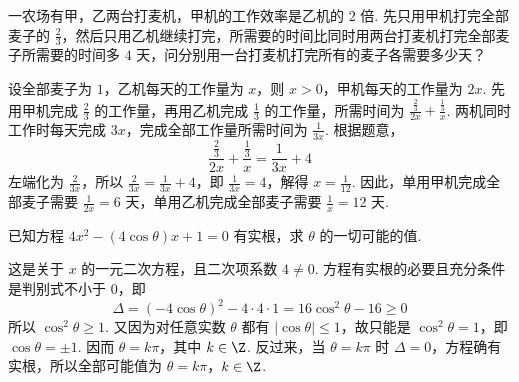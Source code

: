 \begin{problem}
一农场有甲，乙两台打麦机，甲机的工作效率是乙机的 \(2\) 倍. 先只用甲机打完全部麦子的 \(\frac{2}{3}\)，然后只用乙机继续打完，所需要的时间比同时用两台打麦机打完全部麦子所需要的时间多 \(4\) 天，问分别用一台打麦机打完所有的麦子各需要多少天？
\end{problem}

\begin{solution}
设全部麦子为 \(1\)，乙机每天的工作量为 \(x\)，则 \(x>0\)，甲机每天的工作量为 \(2x\). 先用甲机完成 \(\frac{2}{3}\) 的工作量，再用乙机完成 \(\frac{1}{3}\) 的工作量，所需时间为 \(\frac{\frac{2}{3}}{2x}+\frac{\frac{1}{3}}{x}\). 两机同时工作时每天完成 \(3x\)，完成全部工作量所需时间为 \(\frac{1}{3x}\). 根据题意，
\[
\frac{\frac{2}{3}}{2x}+\frac{\frac{1}{3}}{x}=\frac{1}{3x}+4
\]
左端化为 \(\frac{2}{3x}\)，所以 \(\frac{2}{3x}=\frac{1}{3x}+4\)，即 \(\frac{1}{3x}=4\)，解得 \(x=\frac{1}{12}\). 因此，单用甲机完成全部麦子需要 \(\frac{1}{2x}=6\) 天，单用乙机完成全部麦子需要 \(\frac{1}{x}=12\) 天.
\end{solution}

\begin{problem}
已知方程 \(4x^{2}-(4\cos\theta)x+1=0\) 有实根，求 \(\theta\) 的一切可能的值.
\end{problem}

\begin{solution}
这是关于 \(x\) 的一元二次方程，且二次项系数 \(4\neq0\). 方程有实根的必要且充分条件是判别式不小于 \(0\)，即
\[
\Delta=(-4\cos\theta)^2-4\cdot4\cdot1=16\cos^2\theta-16\geqslant0
\]
所以 \(\cos^2\theta\geqslant1\). 又因为对任意实数 \(\theta\) 都有 \(\lvert\cos\theta\rvert\leqslant1\)，故只能是 \(\cos^2\theta=1\)，即 \(\cos\theta=\pm1\). 因而 \(\theta=k\pi\)，其中 \(k\in\Z\). 反过来，当 \(\theta=k\pi\) 时 \(\Delta=0\)，方程确有实根，所以全部可能值为 \(\theta=k\pi\)，\(k\in\Z\).
\end{solution}
